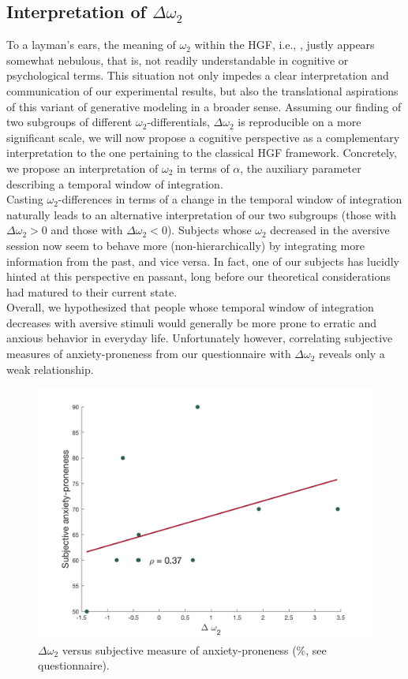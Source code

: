 \documentclass{article}
\begin{document}
\begin{multicols}{2}
\subsection*{Interpretation of $\Delta\omega_2$}
To a layman's ears, the meaning of $\omega_2$ within the HGF, i.e., , justly appears somewhat nebulous, that is, not readily understandable in cognitive or psychological terms. This situation not only impedes a clear interpretation and communication of our experimental results, but also the translational aspirations of this variant of generative modeling in a broader sense. Assuming our finding of two subgroups of different $\omega_2$-differentials, $\Delta\omega_2$ is reproducible on a more significant scale, we will now propose a cognitive perspective as a complementary interpretation to the one pertaining to the classical HGF framework. Concretely, we propose an interpretation of $\omega_2$ in terms of $\alpha$, the auxiliary parameter describing a \textsf{temporal window of integration}. \\ 
Casting $\omega_2$-differences in terms of a change in the temporal window of integration naturally leads to an alternative interpretation of our two subgroups (those with $\Delta\omega_2 > 0$ and those with $\Delta\omega_2 < 0$). Subjects whose $\omega_2$ decreased in the aversive session now seem to behave more  (non-hierarchically) by integrating more information from the past, and vice versa. In fact, one of our subjects has lucidly hinted at this perspective en passant, long before our theoretical considerations had matured to their current state. \\ 
Overall, we hypothesized that people whose temporal window of integration decreases with aversive stimuli would generally be more prone to erratic and anxious behavior in everyday life. Unfortunately however, correlating subjective measures of anxiety-proneness from our questionnaire with $\Delta\omega_2$ reveals only a weak relationship.

\begin{figure}[H]
\centering
\includegraphics[width=.5\textwidth]{omega2_diff_vs_anxiety.png}
\caption{$\Delta\omega_2$ versus subjective measure of anxiety-proneness (\%, see questionnaire).}
\label{fig:sub2}
\end{figure}


\end{multicols}
\end{document}
